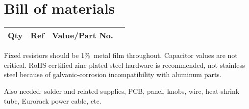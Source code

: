 
%
%
%
%
%
%

\onecolumn
\chapter{Bill of materials}\label{cha:bom}

{\centering
{}

\begin{longtable}{rp{1in}cp{3in}}
  \textbf{Qty} & \textbf{Ref} & \textbf{Value/Part No.} & \\ \hline \endhead

\end{longtable}\par}

Fixed resistors should be 1\%\ metal film throughout.  Capacitor values
are not critical.
RoHS-certified zinc-plated steel hardware is recommended, not stainless
steel because of galvanic-corrosion incompatibility with aluminum parts.

Also needed:  solder and related supplies, PCB, panel, knobs, wire,
heat-shrink tube, Eurorack power cable, etc.

\twocolumn
